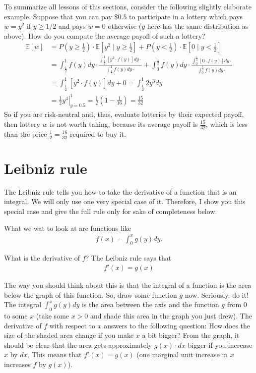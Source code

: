 \documentclass{article}
\begin{document}
To summarize all lessons of this sections, consider the following slightly elaborate example. Suppose that you can pay $\$0.5$ to participate in a lottery which pays $w=y^2$ if $y \geq 1/2$ and pays $w=0$ otherwise ($y$ here has the same distribution as above). How do you compute the average payoff of such a lottery?
\begin{align*}
	\mathbb{E}[w] &= P\left(y \geq \frac{1}{2}\right) \cdot \mathbb{E}\left[y^2 \mid y \geq \frac{1}{2}\right] + P\left(y < \frac{1}{2}\right) \cdot \mathbb{E}\left[0 \mid y < \frac{1}{2}\right]
	\\
	&= \int_{\frac{1}{2}}^1 f(y) dy \cdot \frac{\int_{\frac{1}{2}}^1 \left[y^2 \cdot f(y)\right] dy \cdot}{\int_{\frac{1}{2}}^1 f(y) dy \cdot} + \int_0^{\frac{1}{2}} f(y) dy \cdot \frac{\int_0^{\frac{1}{2}} \left[0 \cdot f(y)\right] dy \cdot}{\int_0^{\frac{1}{2}} f(y) dy \cdot}
	\\
	&= \int_{\frac{1}{2}}^1 \left[y^2 \cdot f(y)\right] dy + 0 = \int_{\frac{1}{2}}^1 2y^3 dy
	\\
	&= \left. \frac{1}{2}y^4 \right|_{y=0.5}^1 = \frac{1}{2} \left(1 - \frac{1}{16}\right) = \frac{15}{32}
\end{align*}
So if you are risk-neutral and, thus, evaluate lotteries by their expected payoff, then lottery $w$ is not worth taking, because its average payoff is $\frac{15}{32}$, which is less than the price $\frac{1}{2}=\frac{16}{32}$ required to buy it.




\section{Leibniz rule}

The Leibniz rule tells you how to take the derivative of a function that is an integral. We will only use one very special case of it. Therefore, I show you this special case and give the full rule only for sake of completeness below.

What we wat to look at are functions like
\begin{align*}
	f(x) = \int_0^x g(y) dy.
\end{align*}

What is the derivative of $f$? The Leibniz rule says that
\begin{align*}
	f'(x)=g(x)
\end{align*}

The way you should think about this is that the integral of a function is the area below the graph of this function. So, draw some function $g$ now. Seriously, do it! The integral $\int_0^x g(y) dy$ is the area between the axis and the function $g$ from $0$ to some $x$ (take some $x > 0$ and shade this area in the graph you just drew). The derivative of $f$ with respect to $x$ answers to the following question: How does the size of the shaded area change if you make $x$ a bit bigger? From the graph, it should be clear that the area gets approximately $g(x) \cdot dx$ bigger if you increase $x$ by $dx$. This means that $f'(x) = g(x)$ (one marginal unit increase in $x$ increases $f$ by $g(x)$).
\end{document}
